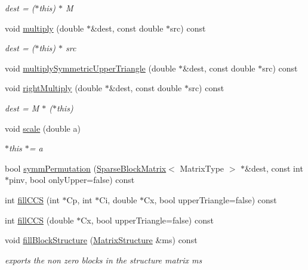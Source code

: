 \begin{DoxyCompactItemize}
\begin{DoxyCompactList}\small\item\em dest = ($\ast$this) $\ast$ M \end{DoxyCompactList}\item 
void \hyperlink{classg2o_1_1SparseBlockMatrix_aa0718ac7391b2d88861bc2c9f1b93ab2}{multiply} (double $\ast$\&dest, const double $\ast$src) const 
\begin{DoxyCompactList}\small\item\em dest = ($\ast$this) $\ast$ src \end{DoxyCompactList}\item 
void \hyperlink{classg2o_1_1SparseBlockMatrix_ab162724d457b342e675c535dd78165cd}{multiply\+Symmetric\+Upper\+Triangle} (double $\ast$\&dest, const double $\ast$src) const 
\item 
void \hyperlink{classg2o_1_1SparseBlockMatrix_abd3d832d520ccbcdd4cfed817cd55e81}{right\+Multiply} (double $\ast$\&dest, const double $\ast$src) const 
\begin{DoxyCompactList}\small\item\em dest = M $\ast$ ($\ast$this) \end{DoxyCompactList}\item 
void \hyperlink{classg2o_1_1SparseBlockMatrix_afbccb3c0404beeba566e21429089e288}{scale} (double a)
\begin{DoxyCompactList}\small\item\em $\ast$this $\ast$= a \end{DoxyCompactList}\item 
bool \hyperlink{classg2o_1_1SparseBlockMatrix_a19b0010ec521b275bc88fda5c66b1b48}{symm\+Permutation} (\hyperlink{classg2o_1_1SparseBlockMatrix}{Sparse\+Block\+Matrix}$<$ Matrix\+Type $>$ $\ast$\&dest, const int $\ast$pinv, bool only\+Upper=false) const 
\item 
int \hyperlink{classg2o_1_1SparseBlockMatrix_a71b97c895688e06ab48eaf53c93c39ed}{fill\+C\+CS} (int $\ast$Cp, int $\ast$Ci, double $\ast$Cx, bool upper\+Triangle=false) const 
\item 
int \hyperlink{classg2o_1_1SparseBlockMatrix_a77bf1e20da0968a5ad55d590406700a7}{fill\+C\+CS} (double $\ast$Cx, bool upper\+Triangle=false) const 
\item 
void \hyperlink{classg2o_1_1SparseBlockMatrix_a7c9f06c801b5421752673b349477f617}{fill\+Block\+Structure} (\hyperlink{classg2o_1_1MatrixStructure}{Matrix\+Structure} \&ms) const 
\begin{DoxyCompactList}\small\item\em exports the non zero blocks in the structure matrix ms \end{DoxyCompactList}\item 

\end{DoxyCompactItemize}
